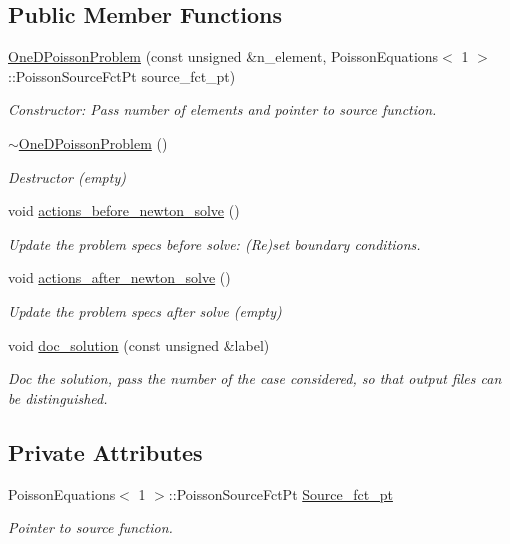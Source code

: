 \subsection*{Public Member Functions}
\begin{DoxyCompactItemize}
\item 
\hyperlink{classOneDPoissonProblem_ab814af5dfd3b7ae665cd20e27da5d9ae}{One\+D\+Poisson\+Problem} (const unsigned \&n\+\_\+element, Poisson\+Equations$<$ 1 $>$\+::Poisson\+Source\+Fct\+Pt source\+\_\+fct\+\_\+pt)
\begin{DoxyCompactList}\small\item\em Constructor\+: Pass number of elements and pointer to source function. \end{DoxyCompactList}\item 
\hyperlink{classOneDPoissonProblem_a940fa32d7939788e27b708818fb046ec}{$\sim$\+One\+D\+Poisson\+Problem} ()
\begin{DoxyCompactList}\small\item\em Destructor (empty) \end{DoxyCompactList}\item 
void \hyperlink{classOneDPoissonProblem_a6e42423869771fbd216326cba516a76b}{actions\+\_\+before\+\_\+newton\+\_\+solve} ()
\begin{DoxyCompactList}\small\item\em Update the problem specs before solve\+: (Re)set boundary conditions. \end{DoxyCompactList}\item 
void \hyperlink{classOneDPoissonProblem_ab023d367cc68b77a7828536333c924ed}{actions\+\_\+after\+\_\+newton\+\_\+solve} ()
\begin{DoxyCompactList}\small\item\em Update the problem specs after solve (empty) \end{DoxyCompactList}\item 
void \hyperlink{classOneDPoissonProblem_aaf42d034e42e7615acfa262a9c56b638}{doc\+\_\+solution} (const unsigned \&label)
\begin{DoxyCompactList}\small\item\em Doc the solution, pass the number of the case considered, so that output files can be distinguished. \end{DoxyCompactList}\end{DoxyCompactItemize}
\subsection*{Private Attributes}
\begin{DoxyCompactItemize}
\item 
Poisson\+Equations$<$ 1 $>$\+::Poisson\+Source\+Fct\+Pt \hyperlink{classOneDPoissonProblem_a5fdff4b9218f56dec7fbc282f2428eef}{Source\+\_\+fct\+\_\+pt}
\begin{DoxyCompactList}\small\item\em Pointer to source function. \end{DoxyCompactList}\end{DoxyCompactItemize}


